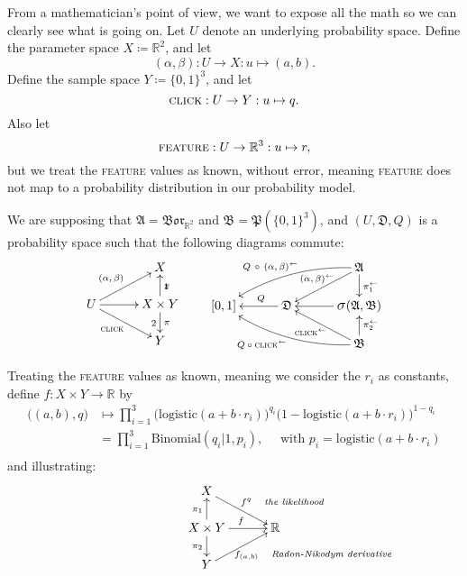 \documentclass[
twoside=true,
paper=letter,
fontsize=9pt,
pagesize=auto,
leqno,
openany,
headsepline,
overfullrule,
]{scrbook}
\theoremstyle{plain}
\theoremstyle{plain}
\theoremstyle{definition}
\theoremstyle{bfnoteitalic}
\theoremstyle{bfnoteroman}
\newcommand{\sigalg}[1]{\mathfrak{#1}}
\newcommand{\definedby}{\coloneqq}
\newcommand{\borel}{\mathfrak{Bor}}
\newcommand{\sagb}{\mathop{\hbox{\large{$\sigma$}}}\nolimits}
\newcommand{\preimage}[1]{#1^{\leftarrow}}
\newcommand{\R}{\mathbb{R}}
\newcommand{\productsig}[2]{\sagb(#1,#2)}
\newcommand{\powerset}{\mathfrak{P}}
\newcommand{\function}{f}
\newcommand{\measurespace}{X}
\newcommand{\measurespaceii}{Y}
\newcommand{\projectionone}{\pi_1}
\newcommand{\projectiontwo}{\pi_2}
\newcommand{\pspace}{\measurespace}%
\newcommand{\sspace}{\measurespaceii}%
\newcommand{\sspacesig}{\sigalg{B}}
\newcommand{\pspacesig}{\sigalg{A}}
\begin{document}
From a mathematician's point of view, we want to expose all the math so we can clearly see what is going on.
Let $U$ denote an underlying probability space.
Define the parameter space
$\pspace \definedby \R^2$,
and let
\[
(\alpha, \beta):
U\to\pspace:
u\mapsto (a,b).
\]
Define the sample space
$\sspace \definedby \{0,1\}^3 $,
and let
\[
\textsc{click}
:U\to\sspace
:u\mapsto q.
\]
Also let
\[
\textsc{feature}
:U\to\R^3
:u\mapsto r,
\]
but we treat the \textsc{feature} values as known, without error, meaning \textsc{feature} does not map to a probability distribution in our probability model.

We are supposing that
$\pspacesig = \borel_{\R^2}$ and
$\sspacesig=\powerset(\{0,1\}^3)$, and
$(U,\sigalg{D},Q)$ is a probability space such that the following diagrams commute:
\[
\xymatrix@R=16pt@C=30pt{
 & \pspace
 \\
 U \ar[ur]^{\makebox[0pt][r]{\scriptsize{$(\alpha, \beta)$}}}
 \ar[dr]_{\makebox[0pt][r]{\scriptsize{\textsc{click}}}}
 \ar[r] &
 \pspace\times\sspace \ar[u]_\projectionone \ar[d]^\projectiontwo
 \\
  & \sspace \\
}
%
\qquad
%
\xymatrix@R=16pt@C=30pt{
 & & \pspacesig
 \ar[dl]_{\kern45pt\makebox[0pt][r]{\scriptsize{$\preimage{(\alpha, \beta)}$}} }
 \ar[d]^{\preimage{\projectionone}}
 \ar@/_10pt/[lld]_{\kern25pt\makebox[0pt][r]{\scriptsize{$Q\,\circ\,\preimage{(\alpha,\beta)}$}}}
 \\
 [0,1] & \sigalg{D} \ar[l]_-{\ Q} &
 \productsig{\pspacesig}{\sspacesig}
 \ar[l]
 \\
 & & \sspacesig
  \ar[u]_{\preimage{\projectiontwo}}
  \ar[ul]^{\kern20pt\makebox[0pt][r]{\scriptsize{$\preimage{\textsc{click}}$}}}
  \ar@/^10pt/[llu]^{\makebox[0pt][r]{\scriptsize{$Q\circ\preimage{\textsc{click}}$}}}
  \\
}
\]


Treating the \textsc{feature} values as known, meaning we consider the $r_i$ as constants,
define $\function:\pspace\times\sspace \to \R$ by
\begin{align*}
\bigl((a,b),q\bigr)
& \mapsto
\prod_{i=1}^{3}
\bigl( \text{logistic}(a + b\cdot r_i) \bigr)^{q_i}
\bigl( 1 - \text{logistic}(a + b\cdot r_i) \bigr)^{1-q_i} \\
& = \prod_{i=1}^{3}
\text{Binomial}(q_i \vert 1, p_i),\quad
\text{ with $p_i = \text{logistic}(a  + b\cdot r_i )$} \\
\end{align*}
and illustrating:
\[
\xymatrix@R=16pt@C=30pt{
\pspace \ar[dr]^{\ \function^{q}\quad \rlap{\emph{\scriptsize the likelihood}}}
& \\
\pspace\times\sspace
\ar[u]^{\projectionone}
\ar[d]_{\projectiontwo}
\ar[r]^{\function}
& \R \\
\sspace
\ar[ur]_{\function_{(a,b)} \quad \rlap{\emph{\scriptsize Radon-Nikodym derivative}}}
&
}
\]
\end{document}
